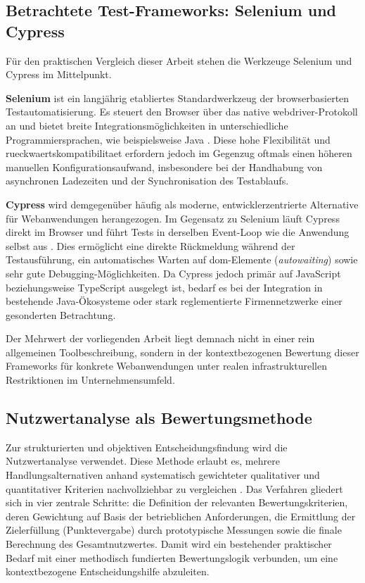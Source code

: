 \subsection{Betrachtete Test-Frameworks: Selenium und Cypress}
Für den praktischen Vergleich dieser Arbeit stehen die Werkzeuge Selenium und Cypress im Mittelpunkt.

\textbf{Selenium} ist ein langjährig etabliertes Standardwerkzeug der browserbasierten Testautomatisierung. Es steuert den Browser über das native \gls{webdriver}-Protokoll an und bietet breite Integrationsmöglichkeiten in unterschiedliche Programmiersprachen, wie beispielsweise Java \cite{Selenium}. Diese hohe Flexibilität und \gls{rueckwaertskompatibilitaet} erfordern jedoch im Gegenzug oftmals einen höheren manuellen Konfigurationsaufwand, insbesondere bei der Handhabung von asynchronen Ladezeiten und der Synchronisation des Testablaufs.

\textbf{Cypress} wird demgegenüber häufig als moderne, entwicklerzentrierte Alternative für Webanwendungen herangezogen. Im Gegensatz zu Selenium läuft Cypress direkt im Browser und führt Tests in derselben Event-Loop wie die Anwendung selbst aus \cite{Cypress}. Dies ermöglicht eine direkte Rückmeldung während der Testausführung, ein automatisches Warten auf \gls{dom}-Elemente (\textit{\gls{autowaiting}}) sowie sehr gute Debugging-Möglichkeiten. Da Cypress jedoch primär auf JavaScript beziehungsweise TypeScript ausgelegt ist, bedarf es bei der Integration in bestehende Java-Ökosysteme oder stark reglementierte Firmennetzwerke einer gesonderten Betrachtung.

Der Mehrwert der vorliegenden Arbeit liegt demnach nicht in einer rein allgemeinen Toolbeschreibung, sondern in der kontextbezogenen Bewertung dieser Frameworks für konkrete Webanwendungen unter realen infrastrukturellen Restriktionen im Unternehmensumfeld.

\subsection{Nutzwertanalyse als Bewertungsmethode}
Zur strukturierten und objektiven Entscheidungsfindung wird die Nutzwertanalyse verwendet. Diese Methode erlaubt es, mehrere Handlungsalternativen anhand systematisch gewichteter qualitativer und quantitativer Kriterien nachvollziehbar zu vergleichen \cite{Kuehnapfel2021}. Das Verfahren gliedert sich in vier zentrale Schritte: die Definition der relevanten Bewertungskriterien, deren Gewichtung auf Basis der betrieblichen Anforderungen, die Ermittlung der Zielerfüllung (Punktevergabe) durch prototypische Messungen sowie die finale Berechnung des Gesamtnutzwertes. Damit wird ein bestehender praktischer Bedarf mit einer methodisch fundierten Bewertungslogik verbunden, um eine kontextbezogene Entscheidungshilfe abzuleiten.